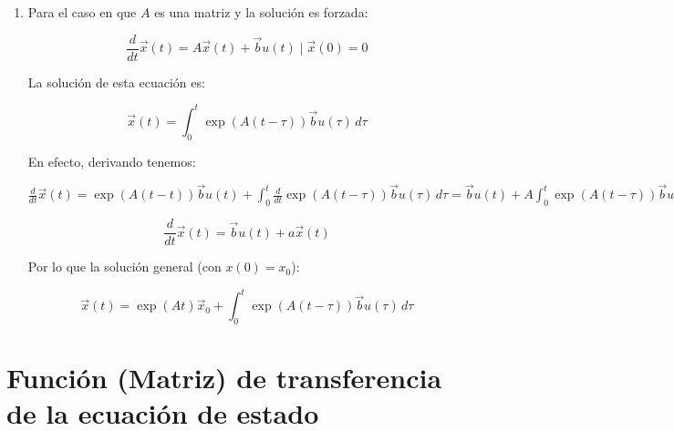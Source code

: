 \begin{enumerate}
\item
Para el caso en que $A$ es una matriz y la solución es forzada:

\begin{equation}
\frac{d}{dt} \vec{x}(t) = A \vec{x}(t) + \vec{b} u(t) \mid \vec{x}(0) = 0
\end{equation}

La solución de esta ecuación es:

\begin{equation}
\vec{x}(t) = \int_0^t \exp{(A(t-\tau))} \vec{b} u(\tau) \, d \tau
\end{equation}

En efecto, derivando tenemos:

\begin{math}
\frac{d}{dt} \vec{x}(t) = \exp{(A(t-t))} \vec{b} u(t) + \int_0^t \frac{d}{dt} \exp{(A(t-\tau))} \vec{b} u(\tau) \, d \tau = \vec{b} u(t) + A \int_0^t \exp{(A(t-\tau))} \vec{b} u(\tau) \, d \tau
\end{math}

\begin{equation}
\frac{d}{dt} \vec{x}(t) = \vec{b} u(t) + a \vec{x}(t)
\end{equation}

Por lo que la solución general (con $x(0) = x_0$):

\begin{equation}
\vec{x}(t) = \exp{(At)} \vec{x}_0 + \int_0^t \exp{(A(t-\tau))} \vec{b} u(\tau) \, d \tau
\end{equation}

\end{enumerate}

\section{Función (Matriz) de transferencia de la ecuación de estado}

